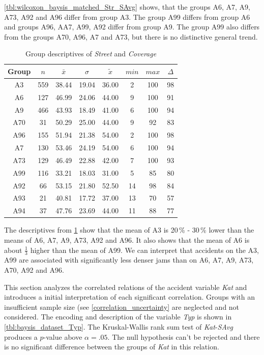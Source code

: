 \cref{tbl:wilcoxon_baysis_matched_Str_SAvg} shows, that the groups A6, A7, A9, A73, A92 and A96 differ from group A3. The group A99 differs from group A6 and groups A96, AA7, A99, A92 differ from group A9. The group A99 also differs from the groups A70, A96, A7 and A73, but there is no distinctive general trend. 
\begin{table}[ht!]
	\tiny
	\centering
	\begin{tabular}{c|c|c|c|c|c|c|c}
	  	\toprule
	 	Group & $n$ & $\bar{x}$ & $\sigma$ & $\tilde{x}$ & $min$ & $max$ & $\Delta$ \\   
	  	\midrule
		A3  & 559 & 38.44 & 19.04 & 36.00 & 2  & 100 & 98 \\ 
	  	A6  & 127 & 46.99 & 24.06 & 44.00 & 9  & 100 & 91 \\ 
	  	A9  & 466 & 43.93 & 18.49 & 41.00 & 6  & 100 & 94 \\ 
	  	A70 & 31  & 50.29 & 25.00 & 44.00 & 9  & 92  & 83 \\ 
	  	A96 & 155 & 51.94 & 21.38 & 54.00 & 2  & 100 & 98 \\ 
	  	A7  & 130 & 53.46 & 24.19 & 54.00 & 6  & 100 & 94 \\ 
	  	A73 & 129 & 46.49 & 22.88 & 42.00 & 7  & 100 & 93 \\ 
	  	A99 & 116 & 33.21 & 18.03 & 31.00 & 5  & 85  & 80 \\ 
	  	A92 & 66  & 53.15 & 21.80 & 52.50 & 14 & 98  & 84 \\ 
	  	A93 & 21  & 40.81 & 17.72 & 37.00 & 13 & 70  & 57 \\ 
	  	A94 & 37  & 47.76 & 23.69 & 44.00 & 11 & 88  & 77 \\ 	
	  	\bottomrule
	\end{tabular}
	\caption{Group descriptives of \textit{Street} and \textit{Coverage}}
	\label{tbl:descriptives_baysis_matched_Str_Cov}
\end{table}
The descriptives from \cref{tbl:descriptives_baysis_matched_Str_Cov} show that the mean of A3 is 20\,\% - 30\,\% lower than the means of A6, A7, A9, A73, A92 and A96. It also shows that the mean of A6 is about $\frac{1}{3}$ higher than the mean of A99. We can interpret that accidents on the A3, A99 are associated with significantly less denser jams than on A6, A7, A9, A73, A70, A92 and A96.

This section analyzes the correlated relations of the accident variable \textit{Kat} and introduces a initial interpretation of each significant correlation. Groups with an insufficient sample size (see \cref{correlation_uncertainty} are neglected and not considered. The encoding and description of the variable \textit{Typ} is shown in \cref{tbl:baysis_dataset_Typ}. The Kruskal-Wallis rank sum test of \textit{Kat}-\textit{SAvg} produces a $p$-value above $\alpha=.05$. The null hypothesis can't be rejected and there is no significant difference between the groups of \textit{Kat} in this relation.

